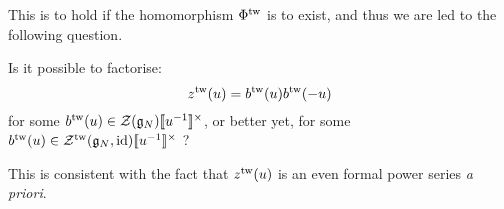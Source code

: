         This is to hold if the homomorphism $\Phi^{\mathrm{tw}}$ is to exist, and thus we are led to the following question.
        \begin{question} \label{question: square_roots_of_twsited_quantum_contractions}
            Is it possible to factorise:
                \begin{equation} \label{equation: square_roots_of_twisted_quantum_contractions}
                    z^{\mathrm{tw}}(u) = b^{\mathrm{tw}}(u) b^{\mathrm{tw}}(-u)
                \end{equation}
            for some $b^{\tw}(u) \in \calZ(\g_N)[\![u^{-1}]\!]^{\x}$, or better yet, for some $b^{\tw}(u) \in \calZ^{\tw}(\g_N, \id)[\![u^{-1}]\!]^{\x}$ ?
        \end{question}
        \begin{remark}
            This is consistent with the fact that $z^{\mathrm{tw}}(u)$ is an even formal power series \textit{a priori}.
        \end{remark}


